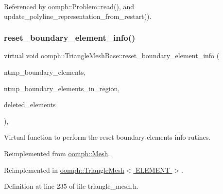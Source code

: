 Referenced by oomph\+::\+Problem\+::read(), and update\+\_\+polyline\+\_\+representation\+\_\+from\+\_\+restart().

\mbox{\label{classoomph_1_1TriangleMeshBase_a87ca1b2f78d61547def3245a5201689e}} 
\subsubsection{\texorpdfstring{reset\+\_\+boundary\+\_\+element\+\_\+info()}{reset\_boundary\_element\_info()}}
{\footnotesize\ttfamily virtual void oomph\+::\+Triangle\+Mesh\+Base\+::reset\+\_\+boundary\+\_\+element\+\_\+info (\begin{DoxyParamCaption}\item[{\hyperlink{classoomph_1_1Vector}{Vector}$<$ unsigned $>$ \&}]{ntmp\+\_\+boundary\+\_\+elements,  }\item[{\hyperlink{classoomph_1_1Vector}{Vector}$<$ \hyperlink{classoomph_1_1Vector}{Vector}$<$ unsigned $>$ $>$ \&}]{ntmp\+\_\+boundary\+\_\+elements\+\_\+in\+\_\+region,  }\item[{\hyperlink{classoomph_1_1Vector}{Vector}$<$ \hyperlink{classoomph_1_1FiniteElement}{Finite\+Element} $\ast$$>$ \&}]{deleted\+\_\+elements }\end{DoxyParamCaption})\hspace{0.3cm}{\ttfamily [inline]}, {\ttfamily [virtual]}}



Virtual function to perform the reset boundary elements info rutines. 



Reimplemented from \hyperlink{classoomph_1_1Mesh_af5495baffd4b886b65a53a0ad67bf0df}{oomph\+::\+Mesh}.



Reimplemented in \hyperlink{classoomph_1_1TriangleMesh_a2ae8220e71309b0fb2b53194c6383f95}{oomph\+::\+Triangle\+Mesh$<$ E\+L\+E\+M\+E\+N\+T $>$}.



Definition at line 235 of file triangle\+\_\+mesh.\+h.

\mbox{\label{classoomph_1_1TriangleMeshBase_aa78fe0d750c842df53e1fa2237205e51}} 

